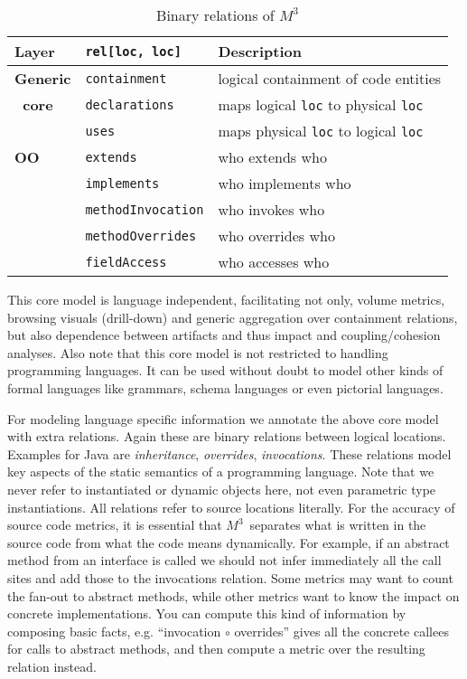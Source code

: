 \documentclass[conference]{IEEEtran}
\newcommand{\mthree}{\ensuremath{M^3}\xspace}
\begin{document}
\begin{table}[t]
\begin{tabularx}{\columnwidth}{|l|l|X|}\hline
 Layer & \lstinline!rel[loc, loc]! & Description \\ \hline 
\textbf{Generic} & \lstinline!containment! & logical containment of 
code entities \\
\textbf{~core} & \lstinline!declarations! & maps logical \lstinline!loc! to physical \lstinline!loc! \\
& \lstinline!uses! & maps physical \lstinline!loc! to logical \lstinline!loc! \\ \hline
 \textbf{OO} & \lstinline!extends! & who extends who \\
& \lstinline!implements! & who implements who \\
& \lstinline!methodInvocation! & who invokes who \\
& \lstinline!methodOverrides! & who overrides who \\
& \lstinline!fieldAccess! & who accesses who \\ \hline
\end{tabularx}
\caption{Binary relations of \mthree \label{table:core}}\vspace{-9mm}
\end{table}

This core model is language independent, facilitating not only, volume
metrics, browsing visuals (drill-down) and generic aggregation over
containment relations, but also dependence between artifacts and thus impact
and coupling/cohesion analyses. Also note that this core model is not
restricted to handling programming languages. It can be used without doubt to
model other kinds of formal languages like grammars, schema languages or even
pictorial languages.

For modeling language specific information we annotate the above core model
with extra relations. Again these are binary relations between logical
locations. Examples for Java are \emph{inheritance}, \emph{overrides},
\emph{invocations}. These relations model key aspects of the static semantics
of a programming language. Note that we never refer to instantiated or dynamic
objects here, not even parametric type instantiations. All relations refer to
source locations literally. For the accuracy of source code metrics, it is
essential that \mthree\  separates what is written in the source code from
what the code means dynamically. For example, if an abstract method from an
interface is called we should not infer immediately all the call sites and add
those to the invocations relation. Some metrics may want to count the fan-out
to abstract methods, while other metrics want to know the impact on concrete
implementations. You can compute this kind of information by composing basic
facts, e.g. ``invocation $\circ$ overrides'' gives all the concrete callees
for calls to abstract methods, and then compute a metric over the resulting
relation instead.
\end{document}
